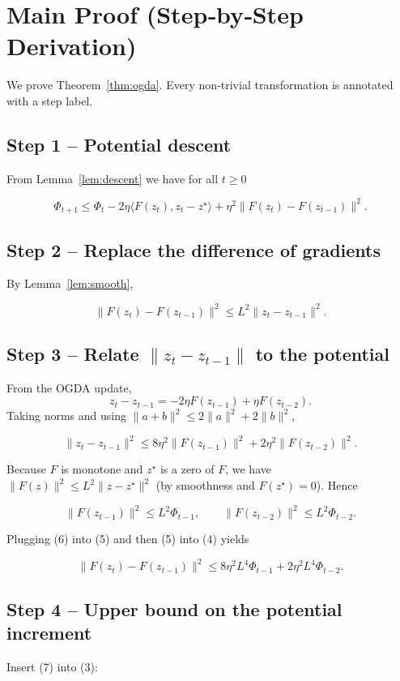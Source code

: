 \documentclass{article}
\begin{document}
\section{Main Proof (Step‑by‑Step Derivation)}
We prove Theorem~\ref{thm:ogda}. Every non‑trivial transformation is annotated with a step label.

\subsection{Step 1 – Potential descent}
From Lemma~\ref{lem:descent} we have for all $t\ge0$  

\[
\Phi_{t+1}\le \Phi_t-2\eta\langle F(z_t),z_t-z^\star\rangle
+\eta^2\|F(z_t)-F(z_{t-1})\|^2 .
\tag{3}
\]

\subsection{Step 2 – Replace the difference of gradients}
By Lemma~\ref{lem:smooth},  

\[
\|F(z_t)-F(z_{t-1})\|^2\le L^2\|z_t-z_{t-1}\|^2 .
\tag{4}
\]

\subsection{Step 3 – Relate $\|z_t-z_{t-1}\|$ to the potential}
From the OGDA update,
\[
z_t-z_{t-1}= -2\eta F(z_{t-1})+\eta F(z_{t-2}) .
\]
Taking norms and using $ \|a+b\|^2\le2\|a\|^2+2\|b\|^2$,  

\[
\|z_t-z_{t-1}\|^2\le 8\eta^2\|F(z_{t-1})\|^2+2\eta^2\|F(z_{t-2})\|^2 .
\tag{5}
\]

Because $F$ is monotone and $z^\star$ is a zero of $F$, we have $\|F(z)\|^2\le L^2\|z-z^\star\|^2$ (by smoothness and $F(z^\star)=0$). Hence  

\[
\|F(z_{t-1})\|^2\le L^2\Phi_{t-1},\qquad 
\|F(z_{t-2})\|^2\le L^2\Phi_{t-2}.
\tag{6}
\]

Plugging (6) into (5) and then (5) into (4) yields  

\[
\|F(z_t)-F(z_{t-1})\|^2\le 8\eta^2L^4\Phi_{t-1}+2\eta^2L^4\Phi_{t-2}.
\tag{7}
\]

\subsection{Step 4 – Upper bound on the potential increment}
Insert (7) into (3):  
\end{document}
